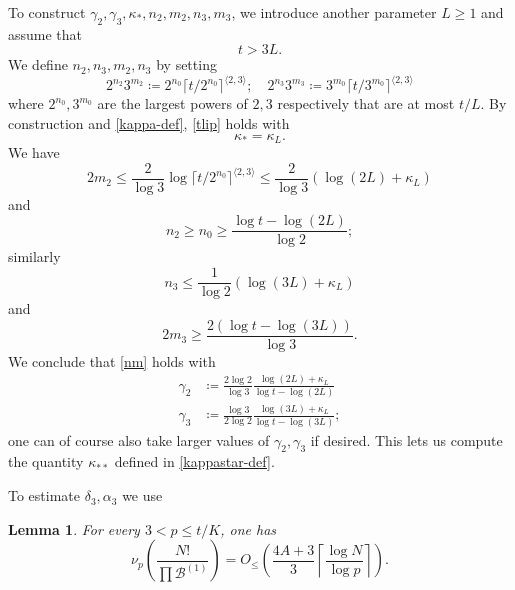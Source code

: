 \documentclass[12pt,a4paper,reqno]{amsart}
\numberwithin{equation}{section}
\theoremstyle{plain}
\newtheorem{lemma}[theorem]{Lemma}
\theoremstyle{definition}
\newcommand\tuple{{\mathcal B}}
\begin{document}
To construct $\gamma_2, \gamma_3, \kappa_*, n_2, m_2, n_3, m_3$, we introduce another parameter $L \geq 1$ and assume that
\begin{equation}\label{t-lower}
  t > 3L.
\end{equation}
We define $n_2,n_3,m_2,n_3$ by setting
$$
2^{n_2} 3^{m_2} \coloneqq 2^{n_0} \lceil t/2^{n_0} \rceil^{\langle 2,3 \rangle}; \quad 
2^{n_3} 3^{m_3} \coloneqq 3^{m_0} \lceil t/3^{m_0} \rceil^{\langle 2,3 \rangle}$$
where $2^{n_0}, 3^{m_0}$ are the largest powers of $2,3$ respectively that are at most $t/L$.  By construction and \eqref{kappa-def}, \eqref{tlip} holds with
\begin{equation}\label{kappas-eq}
  \kappa_* = \kappa_L.
\end{equation}
We have
$$  2m_2 \leq \frac{2}{\log 3} \log \lceil t/2^{n_0} \rceil^{\langle 2,3 \rangle} \leq \frac{2}{\log 3} (\log(2L) + \kappa_L) 
$$
and
$$n_2 \geq n_0 \geq \frac{\log t - \log(2L)}{\log 2};$$
similarly
$$ n_3 \leq \frac{1}{\log 2} (\log(3L)+\kappa_L)$$
and
$$ 2m_3 \geq \frac{2(\log t - \log(3L))}{\log 3}.$$
We conclude that \eqref{nm} holds with
\begin{equation}\label{gammas-def}
\begin{split}
\gamma_2 &\coloneqq \frac{2 \log 2}{\log 3} \frac{\log(2L) + \kappa_L}{\log t - \log(2L)} \\
\gamma_3 &\coloneqq \frac{\log 3}{2\log 2} \frac{\log(3L) + \kappa_L}{\log t - \log(3L)};
\end{split}
\end{equation}
one can of course also take larger values of $\gamma_2,\gamma_3$ if desired.
This lets us compute the quantity $\kappa_{**}$ defined in \eqref{kappastar-def}.

To estimate $\delta_3, \alpha_3$ we use

\begin{lemma}\label{val-bound} For every $3 < p \leq t/K$, one has
\begin{equation}\label{nup} 
  \nu_p\left(\frac{N!}{\prod \tuple^{(1)}}\right) =  
O_{\leq}\left(\frac{4A+3}{3} \left\lceil \frac{\log N}{\log p}  \right\rceil\right).
\end{equation}
\end{lemma}
\end{document}
